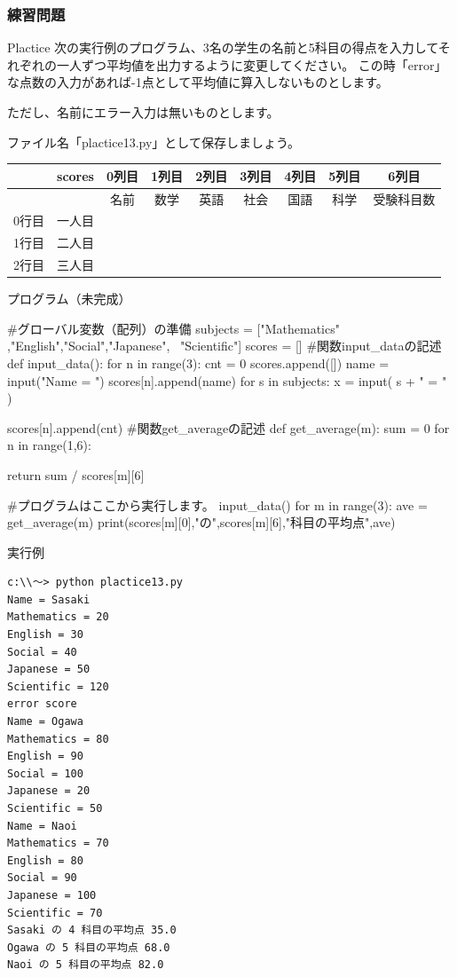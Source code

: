 \documentclass[11pt,a4paper,dvipdfmx,titlepage]{jsreport}
\begin{document}
\subsubsection{練習問題}
\begin{plabox}{Plactice}
次の実行例のプログラム、3名の学生の名前と5科目の得点を入力してそれぞれの一人ずつ平均値を出力するように変更してください。
この時「error」な点数の入力があれば-1点として平均値に算入しないものとします。

ただし、名前にエラー入力は無いものとします。

ファイル名「plactice13.py」として保存しましょう。
\begin{center}
\begin{tabular}{|c|c|c|c|c|c|c|c|c|} \hline
       &scores&0列目&1列目&2列目&3列目&4列目&5列目&6列目 \\ \hline \hline
       & &名前&数学&英語&社会&国語&科学&受験科目数\\ \hline 
0行目  & 一人目& & & & & & &\\ \hline
1行目  & 二人目& & & & & & &\\ \hline
2行目  & 三人目& & & & & & &\\ \hline
\end{tabular}
\end{center}

\begin{codebox}{プログラム（未完成）}
\begin{listing}{1}
#グローバル変数（配列）の準備
subjects = ["Mathematics" ,"English","Social","Japanese", \
			"Scientific"]
scores = []
#関数input_dataの記述
def input_data():
    for n in range(3):
        cnt = 0
        scores.append([])
        name = input("Name = ")
        scores[n].append(name)
        for s in subjects:
            x = input( s + " = " )
            
            
            
            
            
            
            
        scores[n].append(cnt)
#関数get_averageの記述
def get_average(m):
    sum = 0
    for n in range(1,6):
        
        
    return sum / scores[m][6]

#プログラムはここから実行します。
input_data()
for m in range(3):
    ave = get_average(m)
    print(scores[m][0],"の",scores[m][6],"科目の平均点",ave)
\end{listing}
\end{codebox}
\begin{codebox}{実行例}
\begin{verbatim}
c:\\～> python plactice13.py
Name = Sasaki
Mathematics = 20
English = 30
Social = 40
Japanese = 50
Scientific = 120
error score
Name = Ogawa
Mathematics = 80
English = 90
Social = 100
Japanese = 20
Scientific = 50
Name = Naoi
Mathematics = 70
English = 80
Social = 90
Japanese = 100
Scientific = 70
Sasaki の 4 科目の平均点 35.0
Ogawa の 5 科目の平均点 68.0
Naoi の 5 科目の平均点 82.0
\end{verbatim}
\end{codebox}
\end{plabox}
\newpage
\end{document}
